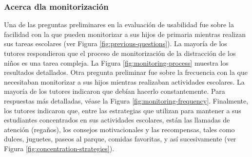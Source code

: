 \documentclass[a4paper,fleqn]{cas-sc}
\begin{document}
	\subsubsection{Acerca dla monitorización}
	Una de las preguntas preliminares en la evaluación de usabilidad fue sobre la facilidad con la que pueden monitorizar a sus hijos de primaria mientras realizan sus tareas escolares (ver Figura \ref{fig:previous-questions}). La mayoría de los tutores respondieron que el proceso de monitorización de la distracción de los niños es una tarea compleja. La Figura \ref{fig:monitoring-process} muestra los resultados detallados. Otra pregunta preliminar fue sobre la frecuencia con la que necesitaban monitorizar a sus hijos mientras realizaban actividades escolares. La mayoría de los tutores indicaron que debían hacerlo constantemente. Para respuestas más detalladas, véase la Figura \ref{fig:monitoring-frequency}. Finalmente, los tutores indicaron que, entre las estrategias que utilizan para mantener a sus estudiantes concentrados en sus actividades escolares, están las llamadas de atención (regaños), los consejos motivacionales y las recompensas, tales como dulces, juguetes, paseos al parque, comidas favoritas, y así sucesivamente (ver Figura \ref{fig:concentration-strategies}).
	
\end{document}
